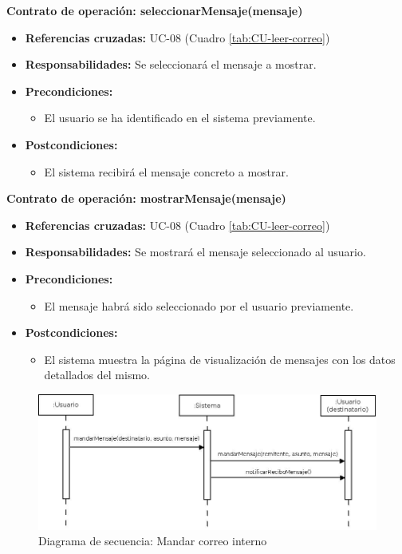 \textbf{Contrato de operación: seleccionarMensaje(mensaje)}
\begin{itemize}
\item \textbf{Referencias cruzadas:} UC-08 (Cuadro \ref{tab:CU-leer-correo})
\item \textbf{Responsabilidades:} Se seleccionará el mensaje a mostrar.
\item \textbf{Precondiciones:} 
 \begin{itemize}
\item El usuario se ha identificado en el sistema previamente.
\end {itemize}
\item \textbf{Postcondiciones:} 
 \begin{itemize}
\item El sistema recibirá el mensaje concreto a mostrar.
\end {itemize}
\end {itemize}

\textbf{Contrato de operación: mostrarMensaje(mensaje)}
\begin{itemize}
\item \textbf{Referencias cruzadas:} UC-08 (Cuadro \ref{tab:CU-leer-correo})
\item \textbf{Responsabilidades:} Se mostrará el mensaje seleccionado al usuario.
\item \textbf{Precondiciones:} 
 \begin{itemize}
\item El mensaje habrá sido seleccionado por el usuario previamente.
\end {itemize}
\item \textbf{Postcondiciones:} 
 \begin{itemize}
\item El sistema muestra la página de visualización de mensajes con los datos detallados del mismo.
\end {itemize}
\end {itemize}


\vspace{7mm}
\dotfill
\vspace{7mm}

\begin{figure}[h!]
\centering
  \includegraphics[scale=.45]{img/secuencias/gestion-servicios-mandar-correo.jpeg}
  \caption{Diagrama de secuencia: Mandar correo interno}
  \label{fig:secuencia-gestion-servicios-mandar-correo}
\end{figure}

